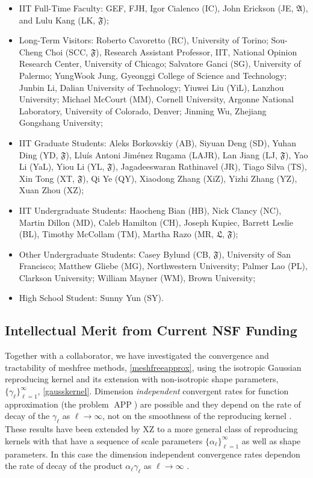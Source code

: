 \documentclass[11pt]{NSFamsart}
\DeclareMathOperator{\APP}{APP}
\newcommand{\fA}{\mathfrak{A}}
\newcommand{\fF}{\mathfrak{F}}
\newcommand{\fL}{\mathfrak{L}}
\begin{document}
\begin{itemize}[leftmargin=2.5ex]
\item IIT Full-Time Faculty: GEF, FJH, Igor Cialenco (IC), John Erickson (JE, $\fA$), and Lulu Kang (LK, $\fF$);
\item Long-Term Visitors: Roberto Cavoretto (RC), University of Torino; Sou-Cheng Choi (SCC, $\fF$), Research Assistant Professor, IIT, National Opinion Research Center, University of Chicago; Salvatore Ganci (SG), University of Palermo; YungWook Jung, Gyeonggi College of Science and Technology; Junbin Li, Dalian University of Technology; Yiuwei Liu (YiL), Lanzhou University; Michael McCourt (MM), Cornell University, Argonne National Laboratory, University of Colorado, Denver; Jinming Wu, Zhejiang Gongshang University;
\item IIT Graduate Students: Aleks Borkovskiy (AB), Siyuan Deng (SD), Yuhan Ding (YD, $\fF$), Llu\'is Antoni Jim\'enez Rugama (LAJR), Lan Jiang (LJ, $\fF$), Yao Li (YaL), Yiou Li (YL, $\fF$), Jagadeeswaran Rathinavel (JR), Tiago Silva (TS), Xin Tong (XT, $\fF$), Qi Ye (QY), Xiaodong Zhang (XiZ), Yizhi Zhang (YZ), Xuan Zhou (XZ);
\item IIT Undergraduate Students: Haocheng Bian (HB), Nick Clancy (NC), Martin Dillon (MD), Caleb Hamilton (CH), Joseph Kupiec, Barrett Leslie (BL), Timothy McCollam (TM), Martha Razo (MR, $\fL$, $\fF$);
\item Other Undergraduate Students: Casey Bylund (CB, $\fF$), University of San Francisco; Matthew Gliebe (MG), Northwestern University; Palmer Lao (PL), Clarkson University; William Mayner (WM), Brown University;
\item High School Student: Sunny Yun (SY).
\end{itemize}

\subsection{Intellectual Merit from Current NSF Funding}

Together with a collaborator, we have investigated the convergence and tractability of meshfree methods, \eqref{meshfreeapprox}, using the isotropic Gaussian reproducing kernel and its extension with non-isotropic shape parameters, $\{\gamma_{\ell}\}_{\ell =1}^{\infty}$, \eqref{gausskernel}. Dimension \emph{independent} convergent rates for function approximation (the problem $\APP$) are possible and they depend on the rate of decay of the $\gamma_{\ell}$ as $\ell \to \infty$, not on the smoothness of the reproducing kernel \citep{FasHicWoz12b, FasHicWoz12a}. These results have been extended by XZ to a more general class of reproducing kernels with that have a sequence of scale parameters $\{\alpha_{\ell}\}_{\ell=1}^{\infty}$ as well as shape parameters.  In this case the dimension independent convergence rates dependon the rate of decay of the product $\alpha_{\ell} \gamma_{\ell}$ as $\ell \to \infty$ \citep{ZhoHic15a}.
\end{document}
